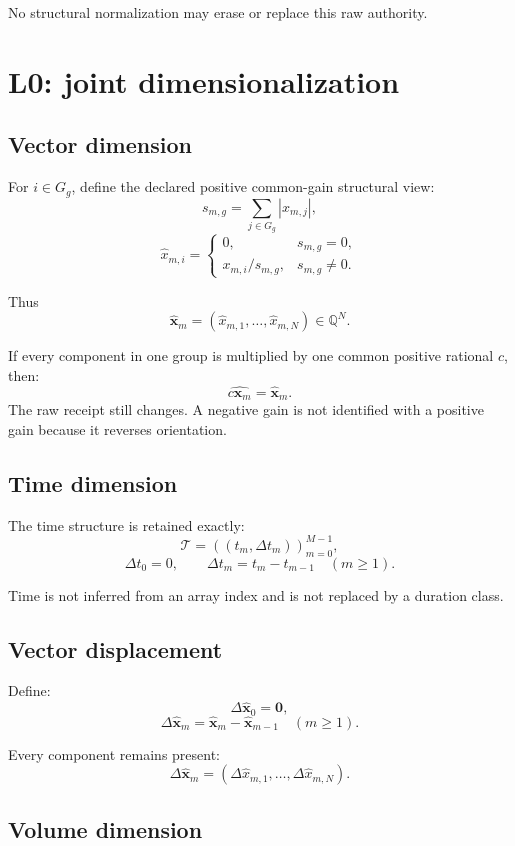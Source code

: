 \documentclass[11pt]{article}
\newcommand{\Q}{\mathbb{Q}}
\newcommand{\Xraw}{\mathbf{x}}
\newcommand{\Xhat}{\widehat{\mathbf{x}}}
\newcommand{\DeltaX}{\Delta\widehat{\mathbf{x}}}
\begin{document}
No structural normalization may erase or replace this raw authority.

\section{L0: joint dimensionalization}

\subsection{Vector dimension}

For \(i\in G_g\), define the declared positive common-gain structural view:
\[
  s_{m,g}
  =
  \sum_{j\in G_g}|x_{m,j}|,
\]
\[
  \widehat{x}_{m,i}
  =
  \begin{cases}
    0, & s_{m,g}=0,\\[4pt]
    x_{m,i}/s_{m,g}, & s_{m,g}\neq 0.
  \end{cases}
\]

Thus
\[
  \Xhat_m
  =
  (\widehat{x}_{m,1},\ldots,\widehat{x}_{m,N})
  \in\Q^N.
\]

If every component in one group is multiplied by one common positive rational
\(c\), then:
\[
  \widehat{c\Xraw_m}=\Xhat_m.
\]
The raw receipt still changes. A negative gain is not identified with a
positive gain because it reverses orientation.

\subsection{Time dimension}

The time structure is retained exactly:
\[
  \mathcal{T}
  =
  \left((t_m,\Delta t_m)\right)_{m=0}^{M-1},
\]
\[
  \Delta t_0=0,
  \qquad
  \Delta t_m=t_m-t_{m-1}\quad(m\geq1).
\]

Time is not inferred from an array index and is not replaced by a duration
class.

\subsection{Vector displacement}

Define:
\[
  \DeltaX_0=\mathbf{0},
\]
\[
  \DeltaX_m
  =
  \Xhat_m-\Xhat_{m-1}
  \quad(m\geq1).
\]

Every component remains present:
\[
  \DeltaX_m
  =
  (\Delta\widehat{x}_{m,1},\ldots,
   \Delta\widehat{x}_{m,N}).
\]

\subsection{Volume dimension}
\end{document}
